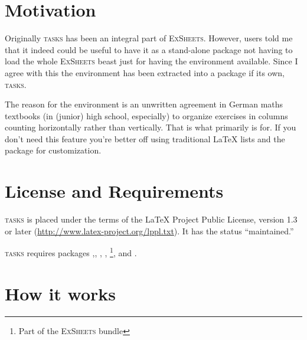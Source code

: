 \documentclass[DIV9,toc=index,toc=bib,numbers=noendperiod]{cnpkgdoc}
\makeatletter
\newcommand*\Tasks{{\scshape\textcolor{main}{tasks}}\xspace}
\newcommand*\ExSheets{{\scshape\textcolor{main}{ExSheets}}\xspace}
\newcommand*\changedversion[1]{%
  \@bsphack
  \marginnote{%
    \footnotesize\sffamily\RaggedRight
    \textcolor{black!75}{Changed in version~#1}}%
  \@esphack}
\makeatother
\begin{document}
\section{Motivation}
\noindent\changedversion{0.7}Originally \Tasks has been an integral part of
\ExSheets.  However, users told me that it indeed could be useful to have it
as a stand-alone package not having to load the whole \ExSheets beast just for
having the  environment available.  Since I agree with this the
environment has been extracted into a package if its own, \Tasks.

The reason for the  environment is an unwritten agreement in
German maths textbooks (in (junior) high school, especially) to organize
exercises in columns counting horizontally rather than vertically.  That is
what  primarily is for. If you don't need this feature you're
better off using traditional \LaTeX{} lists and the  package
for customization.

\section{License and Requirements}\label{sec:license}
\Tasks is placed under the terms of the \LaTeX{} Project Public License,
version 1.3 or later (\url{http://www.latex-project.org/lppl.txt}).  It has
the status ``maintained.''

\Tasks requires packages  ,, ,
, \footnote{Part of the \ExSheets bundle},
 and .

\section{How it works}
\end{document}
